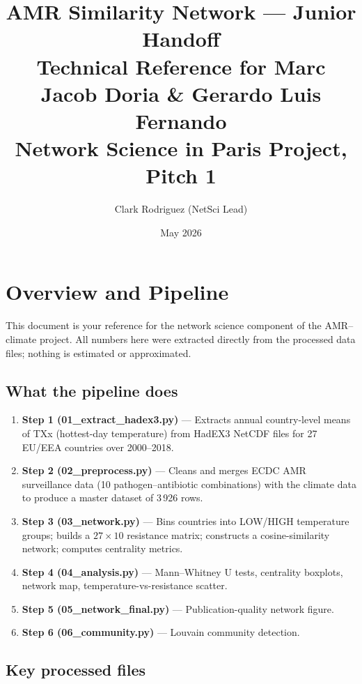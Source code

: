 \documentclass[12pt,a4paper]{article}
\title{\textbf{AMR Similarity Network --- Junior Handoff}\\
\large Technical Reference for Marc Jacob Doria \& Gerardo Luis Fernando\\[0.4em]
\normalsize Network Science in Paris Project, Pitch 1}
\author{Clark Rodriguez (NetSci Lead)}
\date{May 2026}
\begin{document}
\maketitle
\tableofcontents
\clearpage

\section{Overview and Pipeline}

This document is your reference for the network science component of
the AMR--climate project.
All numbers here were extracted directly from the processed data files;
nothing is estimated or approximated.

\subsection*{What the pipeline does}

\begin{enumerate}
  \item \textbf{Step 1 (01\_extract\_hadex3.py)} --- Extracts annual
    country-level means of TXx (hottest-day temperature) from HadEX3
    NetCDF files for 27 EU/EEA countries over 2000--2018.
  \item \textbf{Step 2 (02\_preprocess.py)} --- Cleans and merges
    ECDC AMR surveillance data (10 pathogen--antibiotic combinations)
    with the climate data to produce a master dataset of 3\,926 rows.
  \item \textbf{Step 3 (03\_network.py)} --- Bins countries into LOW/HIGH
    temperature groups; builds a $27 \times 10$ resistance matrix;
    constructs a cosine-similarity network; computes centrality metrics.
  \item \textbf{Step 4 (04\_analysis.py)} --- Mann--Whitney U tests,
    centrality boxplots, network map, temperature-vs-resistance scatter.
  \item \textbf{Step 5 (05\_network\_final.py)} --- Publication-quality
    network figure.
  \item \textbf{Step 6 (06\_community.py)} --- Louvain community
    detection.
\end{enumerate}

\subsection*{Key processed files}
\end{document}
